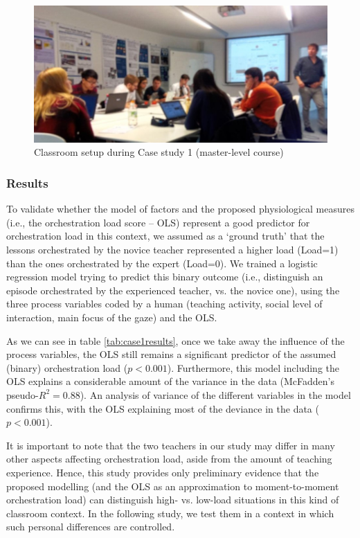 \documentclass[10pt,journal,compsoc]{IEEEtran}
\begin{document}
\begin{figure}[!t]
\centering
\includegraphics[width=\linewidth]{img/Case1Picture}
\caption{Classroom setup during Case study 1 (master-level course)}
\label{fig:case1picture}
\end{figure}

\subsubsection{Results}

To validate whether the model of factors and the proposed physiological measures (i.e., the orchestration load score -- OLS) represent a good predictor for orchestration load in this context, we assumed as a `ground truth' that the lessons orchestrated by the novice teacher represented a higher load (Load=1) than the ones orchestrated by the expert (Load=0). We trained a logistic regression model trying to predict this binary outcome (i.e., distinguish an episode orchestrated by the experienced teacher, vs. the novice one), using the three process variables coded by a human (teaching activity, social level of interaction, main focus of the gaze) and the OLS. 

As we can see in table \ref{tab:case1results}, once we take away the influence of the process variables, the OLS still remains a significant predictor of the assumed (binary) orchestration load ($p<0.001$). Furthermore, this model including the OLS explains a considerable amount of the variance in the data (McFadden's pseudo-$R^2=0.88$). An analysis of variance of the different variables in the model confirms this, with the OLS explaining most of the deviance in the data ($p<0.001$). 

It is important to note that the two teachers in our study may differ in many other aspects affecting orchestration load, aside from the amount of teaching experience. Hence, this study provides only preliminary evidence that the proposed modelling (and the OLS as an approximation to moment-to-moment orchestration load) can distinguish high- vs. low-load situations in this kind of classroom context. In the following study, we test them in a context in which such personal differences are controlled.
\end{document}
